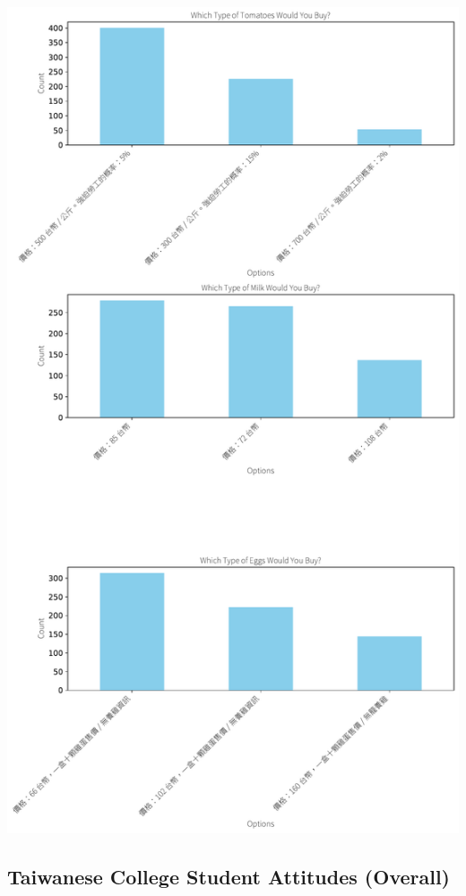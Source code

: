 \documentclass[
  letterpaper,
  DIV=11,
  numbers=noendperiod]{scrartcl}
\begin{document}
\includegraphics{_thesis_files/figure-pdf/cell-69-output-1.pdf}

\newpage

\subsection{Taiwanese College Student Attitudes
(Overall)}\label{taiwanese-college-student-attitudes-overall}
\end{document}
